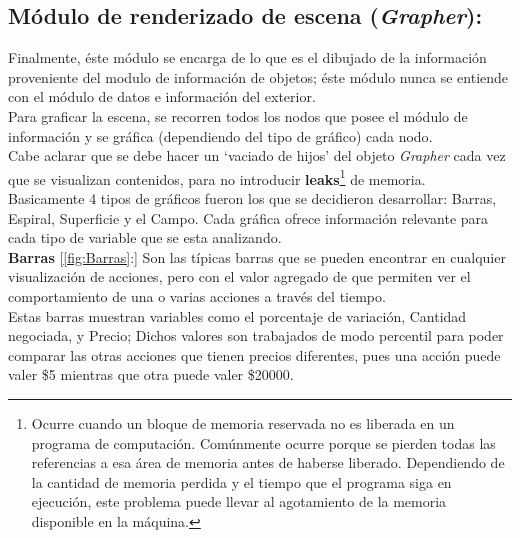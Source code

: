 \subsection{Módulo de renderizado de escena (\emph{Grapher}):}

Finalmente, éste módulo se encarga de lo que es el dibujado de la información proveniente del modulo de información de objetos; éste módulo nunca se entiende con el módulo de datos e información del exterior.\\
 
Para graficar la escena, se recorren todos los nodos que posee el módulo de información y se gráfica (dependiendo del tipo de gráfico) cada nodo\cite{vis:InteractiveVisSmalWorldGraphs}.\\


Cabe aclarar que se debe hacer un `vaciado de hijos' del objeto \emph{Grapher} cada vez que se visualizan contenidos, para no introducir \textbf{leaks}\footnote{Ocurre cuando un bloque de memoria reservada no es liberada en un programa de computación. Comúnmente ocurre porque se pierden todas las referencias a esa área de memoria antes de haberse liberado. Dependiendo de la cantidad de memoria perdida y el tiempo que el programa siga en ejecución, este problema puede llevar al agotamiento de la memoria disponible en la máquina.} de memoria.\\



Basicamente 4 tipos de gráficos fueron los que se decidieron desarrollar: Barras, Espiral, Superficie y el Campo. Cada gráfica ofrece información relevante para cada tipo de variable que se esta analizando. \\

\textbf{Barras} [\ref{fig:Barras}:] Son las típicas barras que se pueden encontrar en cualquier visualización de acciones, pero con el valor agregado de que permiten ver el comportamiento de una o varias acciones a través del tiempo.\\

Estas barras muestran variables como el porcentaje de variación, Cantidad negociada, y Precio; Dichos valores son trabajados de modo percentil para poder comparar las otras acciones que tienen precios diferentes, pues una acción puede valer \$5 mientras que otra puede valer \$20000.\\


